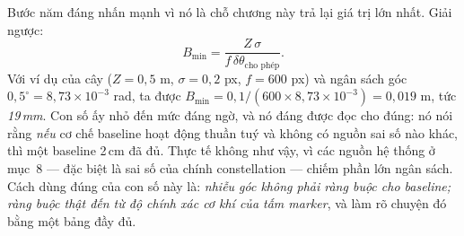 \documentclass[../../marker.tex]{subfiles}
\begin{document}
Bước năm đáng nhấn mạnh vì nó là chỗ chương này trả lại giá trị lớn nhất. Giải ngược:
\[
B_{\min} = \frac{Z\,\sigma}{f\,\delta\theta_{\text{cho phép}}}.
\]
Với ví dụ của cây (\(Z = 0{,}5\) m, \(\sigma = 0{,}2\) px, \(f = 600\) px) và ngân sách góc \(0{,}5^\circ = 8{,}73\times10^{-3}\) rad, ta được \(B_{\min} = 0{,}1/(600 \times 8{,}73\times10^{-3}) = 0{,}019\) m, tức \emph{19\,mm}. Con số ấy nhỏ đến mức đáng ngờ, và nó đáng được đọc cho đúng: nó nói rằng \emph{nếu} cơ chế baseline hoạt động thuần tuý và không có nguồn sai số nào khác, thì một baseline 2\,cm đã đủ. Thực tế không như vậy, vì các nguồn hệ thống ở mục~8 --- đặc biệt là sai số của chính constellation --- chiếm phần lớn ngân sách. Cách dùng đúng của con số này là: \emph{nhiễu góc không phải ràng buộc cho baseline; ràng buộc thật đến từ độ chính xác cơ khí của tấm marker}, và  làm rõ chuyện đó bằng một bảng đầy đủ.
\end{document}
